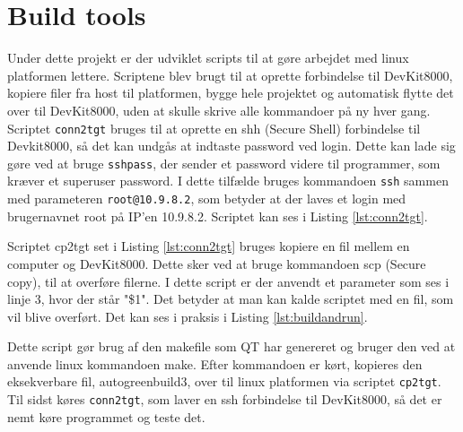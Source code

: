 \section{Build tools} \label{sec:Build_impl}

Under dette projekt er der udviklet scripts til at gøre arbejdet med linux platformen lettere. Scriptene blev brugt til at oprette forbindelse til DevKit8000, kopiere filer fra host til platformen, bygge hele projektet og automatisk flytte det over til DevKit8000, uden at skulle skrive alle kommandoer på ny hver gang.
Scriptet \texttt{conn2tgt} bruges til at oprette en shh (Secure Shell) forbindelse til Devkit8000, så det kan undgås at indtaste password ved login. Dette kan lade sig gøre ved at bruge \texttt{sshpass}, der sender et password videre til programmer, som kræver et superuser password. I dette tilfælde bruges kommandoen \texttt{ssh} sammen med parameteren \texttt{root@10.9.8.2}, som betyder at der laves et login med brugernavnet root på IP'en 10.9.8.2. Scriptet kan ses i Listing \ref{lst:conn2tgt}.



Scriptet cp2tgt set i Listing \ref{lst:conn2tgt} bruges kopiere en fil mellem en computer og DevKit8000. Dette sker ved at bruge kommandoen scp (Secure copy), til at overføre filerne. I dette script er der anvendt et parameter som ses i linje 3, hvor der står "\$1". Det betyder at man kan kalde scriptet med en fil, som vil blive overført. Det kan ses i praksis i Listing \ref{lst:buildandrun}.



Dette script gør brug af den makefile som QT har genereret og bruger den ved at anvende linux kommandoen make. Efter kommandoen er kørt, kopieres den eksekverbare fil, autogreenbuild3, over til linux platformen via scriptet \texttt{cp2tgt}. Til sidst køres \texttt{conn2tgt}, som laver en ssh forbindelse til DevKit8000, så det er nemt køre programmet og teste det.



